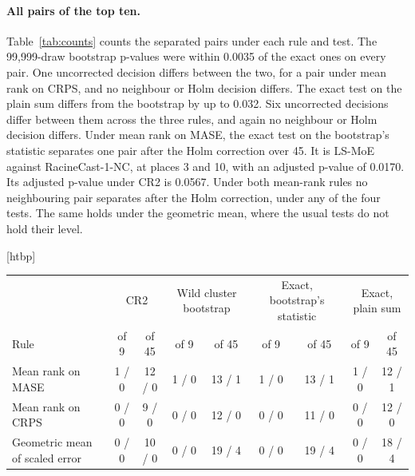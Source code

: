 \documentclass{article}
\makeatletter
\renewenvironment{table}
  {\setlength{\abovecaptionskip}{6\p@}%
   \setlength{\belowcaptionskip}{\z@}%
   \@float{table}}
  {\end@float}
\makeatother
\begin{document}
\paragraph{All pairs of the top ten.} Table~\ref{tab:counts} counts the separated pairs under
each rule and test. The 99{,}999-draw bootstrap p-values were within 0.0035 of the exact ones
on every pair. One uncorrected decision differs between the two, for a pair under mean rank on
CRPS, and no neighbour or Holm decision differs. The exact test on the plain sum differs from
the bootstrap by up to 0.032. Six uncorrected decisions differ between them across the three
rules, and again no neighbour or Holm decision differs. Under mean rank on MASE, the exact
test on the bootstrap's statistic separates one pair after the Holm correction over 45. It is
LS-MoE against RacineCast-1-NC, at places 3 and 10, with an adjusted p-value of 0.0170. Its
adjusted p-value under CR2 is 0.0567. Under both mean-rank rules no neighbouring pair
separates after the Holm correction, under any of the four tests. The same holds under the
geometric mean, where the usual tests do not hold their level.

\begin{table}[htbp]
\centering
\scriptsize
\setlength{\tabcolsep}{4pt}
\begin{tabular}{@{}lcccccccc@{}}
\toprule
& \multicolumn{2}{c}{CR2} & \multicolumn{2}{c}{Wild cluster bootstrap}
& \multicolumn{2}{c}{Exact, bootstrap's statistic} & \multicolumn{2}{c}{Exact, plain sum} \\
\cmidrule(lr){2-3}\cmidrule(lr){4-5}\cmidrule(lr){6-7}\cmidrule(lr){8-9}
Rule & of 9 & of 45 & of 9 & of 45 & of 9 & of 45 & of 9 & of 45 \\
\midrule
Mean rank on MASE & 1 / 0 & 12 / 0 & 1 / 0 & 13 / 1 & 1 / 0 & 13 / 1 & 1 / 0 & 12 / 1 \\
Mean rank on CRPS & 0 / 0 & \phantom{1}9 / 0 & 0 / 0 & 12 / 0 & 0 / 0 & 11 / 0 & 0 / 0 & 12 / 0 \\
Geometric mean of scaled error & 0 / 0 & 10 / 0 & 0 / 0 & 19 / 4 & 0 / 0 & 19 / 4 & 0 / 0 & 18 / 4 \\
\bottomrule
\end{tabular}
\caption{Separated pairs of GIFT-Eval's displayed top ten, by rule and test. Each cell gives
the count before and after the Holm correction, for the 9 neighbouring pairs and for all 45
pairs. The wild cluster bootstrap used 99{,}999 draws, and the exact tests list all $2^{28}$
sign patterns. The geometric-mean row uses the pairs of the mean-rank top ten. The usual tests
do not hold their level on the geometric mean. CR2 and the wild cluster bootstrap declare a
difference about 16\% of the time when there is none (Appendix~\ref{app:calib}), and the exact
tests are exact only for symmetric data. That row is therefore not evidence in either
direction.}
\label{tab:counts}
\end{table}
\end{document}
